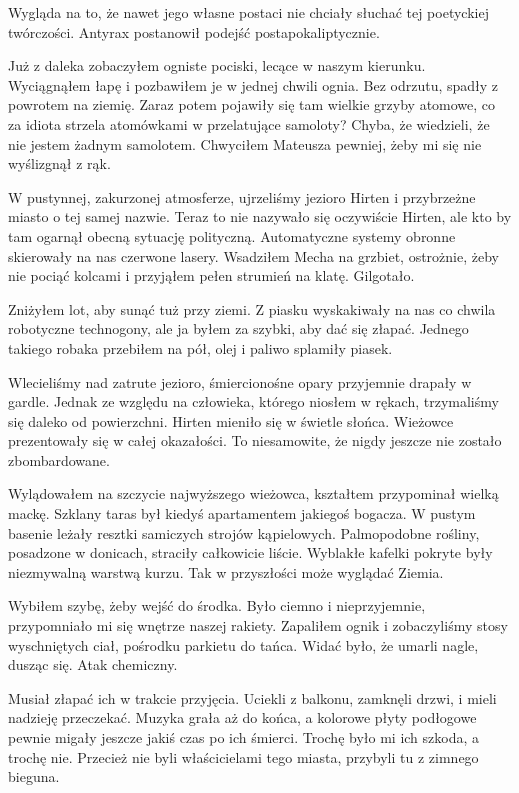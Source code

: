 \divider{}

Wygląda na to, że nawet jego własne postaci nie chciały słuchać tej poetyckiej twórczości.
Antyrax postanowił podejść postapokaliptycznie.

\divider{}

Już z daleka zobaczyłem ogniste pociski, lecące w naszym kierunku.
Wyciągnąłem łapę i pozbawiłem je w jednej chwili ognia.
Bez odrzutu, spadły z powrotem na ziemię.
Zaraz potem pojawiły się tam wielkie grzyby atomowe, co za idiota strzela atomówkami w przelatujące samoloty?
Chyba, że wiedzieli, że nie jestem żadnym samolotem.
Chwyciłem Mateusza pewniej, żeby mi się nie wyślizgnął z rąk.

W pustynnej, zakurzonej atmosferze, ujrzeliśmy jezioro Hirten i przybrzeżne miasto o tej samej nazwie.
Teraz to nie nazywało się oczywiście Hirten, ale kto by tam ogarnął obecną sytuację polityczną.
Automatyczne systemy obronne skierowały na nas czerwone lasery. 
Wsadziłem Mecha na grzbiet, ostrożnie, żeby nie pociąć kolcami i przyjąłem pełen strumień na klatę. Gilgotało.

Zniżyłem lot, aby sunąć tuż przy ziemi.
Z piasku wyskakiwały na nas co chwila robotyczne technogony, ale ja byłem za szybki, aby dać się złapać.
Jednego takiego robaka przebiłem na pół, olej i paliwo splamiły piasek.

Wlecieliśmy nad zatrute jezioro, śmiercionośne opary przyjemnie drapały w gardle.
Jednak ze względu na człowieka, którego niosłem w rękach, trzymaliśmy się daleko od powierzchni.
Hirten mieniło się w świetle słońca. Wieżowce prezentowały się w całej okazałości.
To niesamowite, że nigdy jeszcze nie zostało zbombardowane. 

Wylądowałem na szczycie najwyższego wieżowca, kształtem przypominał wielką mackę.
Szklany taras był kiedyś apartamentem jakiegoś bogacza. W pustym basenie leżały resztki samiczych strojów kąpielowych.
Palmopodobne rośliny, posadzone w donicach, straciły całkowicie liście.
Wyblakłe kafelki pokryte były niezmywalną warstwą kurzu.
Tak w przyszłości może wyglądać Ziemia.

Wybiłem szybę, żeby wejść do środka.
Było ciemno i nieprzyjemnie, przypomniało mi się wnętrze naszej rakiety.
Zapaliłem ognik i zobaczyliśmy stosy wyschniętych ciał, pośrodku parkietu do tańca.
Widać było, że umarli nagle, dusząc się. Atak chemiczny.

Musiał złapać ich w trakcie przyjęcia.
Uciekli z balkonu, zamknęli drzwi, i mieli nadzieję przeczekać.
Muzyka grała aż do końca, a kolorowe płyty podłogowe pewnie migały jeszcze jakiś czas po ich śmierci.
Trochę było mi ich szkoda, a trochę nie.
Przecież nie byli właścicielami tego miasta, przybyli tu z zimnego bieguna.


